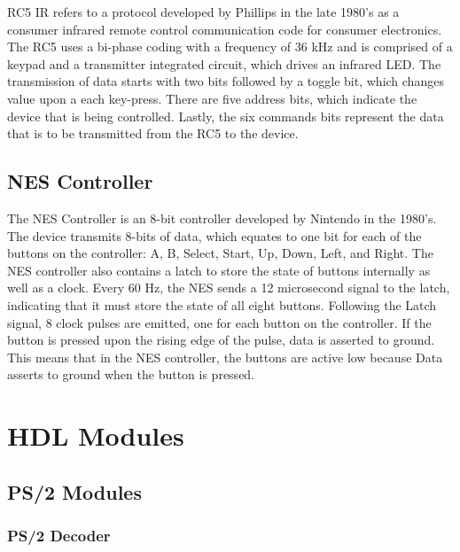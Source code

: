 \documentclass[12pt]{article}
\numberwithin{figure}{subsection}
\begin{document}
RC5 IR refers to a protocol developed by Phillips in the late 1980’s as a consumer infrared remote control communication code for consumer electronics. The RC5 uses a bi-phase coding with a frequency of 36 kHz and is comprised of a keypad and a transmitter integrated circuit, which drives an infrared LED. The transmission of data starts with two bits followed by a toggle bit, which changes value upon a each key-press. There are five address bits, which indicate the device that is being controlled. Lastly, the six commands bits represent the data that is to be transmitted from the RC5 to the device.

\subsection{NES Controller}

The NES Controller is an 8-bit controller developed by Nintendo in the 1980’s. The device transmits 8-bits of data, which equates to one bit for each of the buttons on the controller: A, B, Select, Start, Up, Down, Left, and Right. The NES controller also contains a latch to store the state of buttons internally as well as a clock. Every 60 Hz, the NES sends a 12 microsecond signal to the latch, indicating that it must store the state of all eight buttons. Following the Latch signal, 8 clock pulses are emitted, one for each button on the controller. If the button is pressed upon the rising edge of the pulse, data is asserted to ground. This means that in the NES controller, the buttons are active low because Data asserts to ground when the button is pressed.

\section{HDL Modules}

\subsection{PS/2 Modules}

\subsubsection{PS/2 Decoder}
\end{document}

